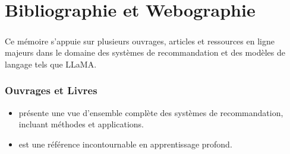 \chapter*{Bibliographie et Webographie}

\paragraph{}
Ce mémoire s'appuie sur plusieurs ouvrages, articles et ressources en ligne majeurs dans le domaine des systèmes de recommandation et des modèles de langage tels que LLaMA.

\subsection*{Ouvrages et Livres}
\begin{itemize}[leftmargin=1.5cm]
    \item \cite{ricci2015recommender} présente une vue d'ensemble complète des systèmes de recommandation, incluant méthodes et applications.
    \item \cite{goodfellow2016deep} est une référence incontournable en apprentissage profond.
\end{itemize}

